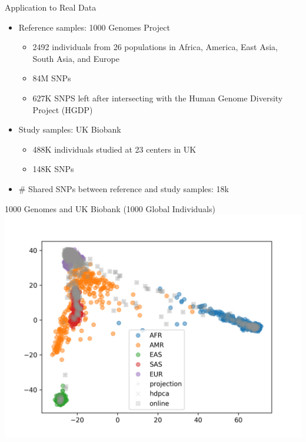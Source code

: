 \documentclass{beamer}
\begin{document}
\begin{frame}{Application to Real Data}
\begin{itemize}
    \item Reference samples: 1000 Genomes Project
        \begin{itemize}
        \item 2492 individuals from 26 populations in Africa, America, East Asia, South Asia, and Europe
        \item 84M SNPs
        \item 627K SNPS left after intersecting with the Human Genome Diversity Project (HGDP)
        \end{itemize}
    \item Study samples: UK Biobank
        \begin{itemize}
        \item 488K individuals studied at 23 centers in UK
        \item 148K SNPs
        \end{itemize}
    \item \# Shared SNPs between reference and study samples: 18k
\end{itemize}
\end{frame}

\begin{frame}{1000 Genomes and UK Biobank (1000 Global Individuals)}
\includegraphics[height=0.9\textheight]{pcs_save.png}
\end{frame}
\end{document}
